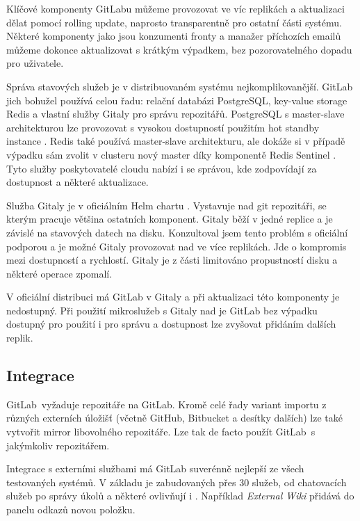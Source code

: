             Klíčové komponenty GitLabu můžeme provozovat ve víc replikách a aktualizaci dělat pomocí rolling update, naprosto transparentně pro ostatní části systému. Některé komponenty jako jsou konzumenti fronty a manažer příchozích emailů můžeme dokonce aktualizovat s krátkým výpadkem, bez pozorovatelného dopadu pro uživatele.

            Správa stavových služeb je v distribuovaném systému nejkomplikovanější. GitLab jich bohužel používá celou řadu: relační databázi PostgreSQL, key-value storage Redis a vlastní služby Gitaly pro správu repozitářů. PostgreSQL s master-slave architekturou lze provozovat s vysokou dostupností použitím hot standby instance \cite{kim-postgres}. Redis také používá master-slave architekturu, ale dokáže si v případě výpadku sám zvolit v clusteru nový master díky komponentě Redis Sentinel \cite{redis-ha}. Tyto služby poskytovatelé cloudu nabízí i se správou, kde zodpovídají za dostupnost a některé aktualizace.

            Služba Gitaly je v oficiálním Helm chartu . Vystavuje   nad git repozitáři, se kterým pracuje většina ostatních komponent. Gitaly běží v jedné replice a je závislé na stavových datech na disku. Konzultoval jsem tento problém s oficiální podporou a je možné Gitaly provozovat nad  ve více replikách. Jde o kompromis mezi dostupností a rychlostí. Gitaly je z části limitováno propustností disku a  některé operace zpomalí.

            V oficiální distribuci má GitLab  v Gitaly a při aktualizaci této komponenty je nedostupný. Při použití mikroslužeb s Gitaly nad  je GitLab bez výpadku dostupný pro použití i pro správu a dostupnost lze zvyšovat přidáním dalších replik.

    \subsection{Integrace}
        GitLab~\CI vyžaduje repozitáře na GitLab. Kromě celé řady variant importu z různých externích úložišť (včetně GitHub, Bitbucket a desítky dalších) lze také vytvořit mirror libovolného repozitáře. Lze tak de facto použít GitLab~\CI s jakýmkoliv repozitářem.

        Integrace s externími službami má GitLab suverénně nejlepší ze všech testovaných systémů. V základu je zabudovaných přes 30 služeb, od chatovacích služeb po správy úkolů a některé ovlivňují i . Například \textit{External Wiki} přidává do panelu odkazů novou položku.

